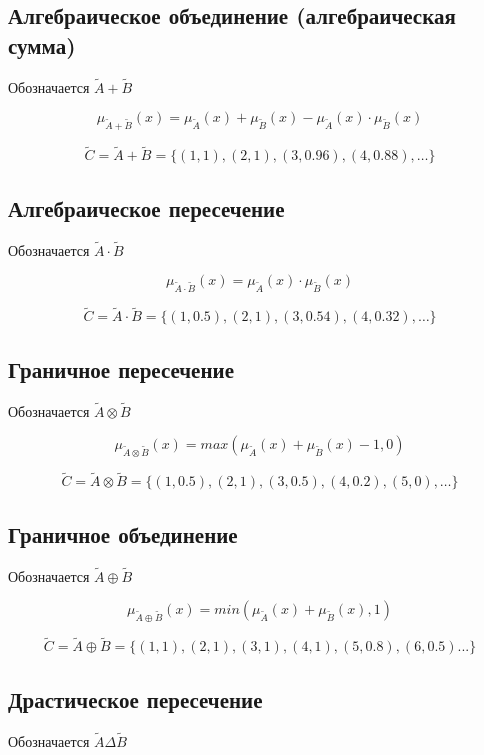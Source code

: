 		\subsection{Алгебраическое объединение (алгебраическая сумма)}
			Обозначается $\tilde A + \tilde B$
		
	        	\[\mu_{\tilde A + \tilde B}(x) = \mu_{\tilde A}(x) + \mu_{\tilde B}(x) - 
	        	\mu_{\tilde A}(x) \cdot \mu_{\tilde B}(x)\]
		    
			\[\tilde C = \tilde A + \tilde B = \{(1, 1), (2, 1), (3, 0.96), (4, 0.88), \dots\}\]
			
		\subsection{Алгебраическое пересечение}
			Обозначается $\tilde A \cdot \tilde B$
		
			\[\mu_{\tilde A \cdot \tilde B}(x) = \mu_{\tilde A}(x) \cdot \mu_{\tilde B}(x)\]
			
			\[\tilde C = \tilde A \cdot \tilde B = \{(1, 0.5), (2, 1), (3, 0.54), (4, 0.32), \dots\}\]
			
		\subsection{Граничное пересечение} 
			Обозначается $\tilde A \otimes \tilde B$
			
			\[\mu_{\tilde A \otimes \tilde B}(x) = max(\mu_{\tilde A}(x) + \mu_{\tilde B}(x) - 1, 0)\]
			
			\[\tilde C = \tilde A \otimes \tilde B = \{(1, 0.5), (2, 1), (3, 0.5), (4, 0.2), (5, 0), \dots\}\]
			
		\subsection{Граничное объединение}
			Обозначается $\tilde A \oplus \tilde B$
		
			\[\mu_{\tilde A \oplus \tilde B}(x) = min(\mu_{\tilde A}(x) + \mu_{\tilde B}(x), 1)\]
			
			\[\tilde C = \tilde A \oplus \tilde B = \{(1, 1), (2, 1), (3, 1), (4, 1), (5, 0.8), (6, 0.5) ...\}\]
			
		\subsection{Драстическое пересечение}
		    	Обозначается $\tilde A \Delta \tilde B$
		

